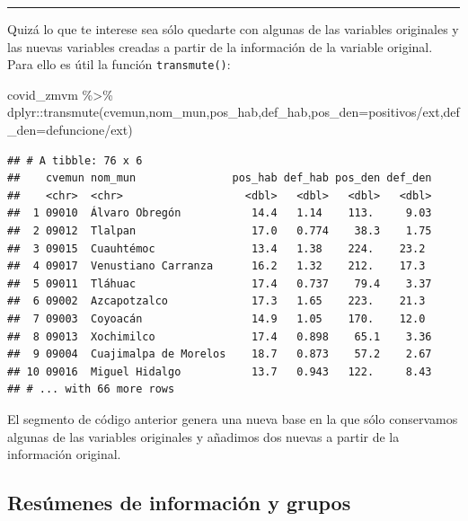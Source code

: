 \documentclass[
  11pt,
  oneside]{book}
\newenvironment{Shaded}{\begin{snugshade}}{\end{snugshade}}
\newcommand{\AttributeTok}[1]{\textcolor[rgb]{0.77,0.63,0.00}{#1}}
\newcommand{\FunctionTok}[1]{\textcolor[rgb]{0.00,0.00,0.00}{#1}}
\newcommand{\NormalTok}[1]{#1}
\newcommand{\SpecialCharTok}[1]{\textcolor[rgb]{0.00,0.00,0.00}{#1}}
\begin{document}
\begin{center}\rule{0.5\linewidth}{0.5pt}\end{center}

Quizá lo que te interese sea sólo quedarte con algunas de las variables originales y las nuevas variables creadas a partir de la información de la variable original. Para ello es útil la función \texttt{transmute()}:

\begin{Shaded}
\begin{Highlighting}[]
\NormalTok{covid\_zmvm }\SpecialCharTok{\%\textgreater{}\%} 
\NormalTok{  dplyr}\SpecialCharTok{::}\FunctionTok{transmute}\NormalTok{(cvemun,nom\_mun,pos\_hab,def\_hab,}\AttributeTok{pos\_den=}\NormalTok{positivos}\SpecialCharTok{/}\NormalTok{ext,}\AttributeTok{def\_den=}\NormalTok{defuncione}\SpecialCharTok{/}\NormalTok{ext)}
\end{Highlighting}
\end{Shaded}

\begin{verbatim}
## # A tibble: 76 x 6
##    cvemun nom_mun               pos_hab def_hab pos_den def_den
##    <chr>  <chr>                   <dbl>   <dbl>   <dbl>   <dbl>
##  1 09010  Álvaro Obregón           14.4   1.14    113.     9.03
##  2 09012  Tlalpan                  17.0   0.774    38.3    1.75
##  3 09015  Cuauhtémoc               13.4   1.38    224.    23.2 
##  4 09017  Venustiano Carranza      16.2   1.32    212.    17.3 
##  5 09011  Tláhuac                  17.4   0.737    79.4    3.37
##  6 09002  Azcapotzalco             17.3   1.65    223.    21.3 
##  7 09003  Coyoacán                 14.9   1.05    170.    12.0 
##  8 09013  Xochimilco               17.4   0.898    65.1    3.36
##  9 09004  Cuajimalpa de Morelos    18.7   0.873    57.2    2.67
## 10 09016  Miguel Hidalgo           13.7   0.943   122.     8.43
## # ... with 66 more rows
\end{verbatim}

El segmento de código anterior genera una nueva base en la que sólo conservamos algunas de las variables originales y añadimos dos nuevas a partir de la información original.

\hypertarget{resuxfamenes-de-informaciuxf3n-y-grupos}{%
\subsection{Resúmenes de información y grupos}\label{resuxfamenes-de-informaciuxf3n-y-grupos}}
\end{document}
